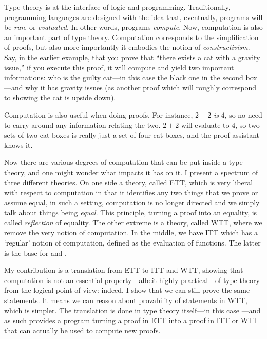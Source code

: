 Type theory is at the interface of logic and programming. Traditionally,
programming languages are designed with the idea that, eventually, programs
will be \emph{run}, or \emph{evaluated}. In other words, programs
\emph{compute}.
Now, computation is also an important part of type theory. Computation
corresponds to the simplification of proofs, but also more importantly it
embodies the notion of \emph{constructivism}. Say, in the earlier example,
that you prove that ``there exists a cat with a gravity issue,'' if you execute
this proof, it will compute and yield two important informations: who is the
guilty cat---in this case the black one in the second box---and why it has
gravity issues (as another proof which will roughly correspond to showing the
cat is upside down).

Computation is also useful when doing proofs. For instance, \(2 + 2\) \emph{is}
\(4\), so no need to carry around any information relating the two. \(2 + 2\)
will evaluate to \(4\), so two sets of two cat boxes is really just a set of
four cat boxes, and the proof assistant knows it.

Now there are various degrees of computation that can be put inside a type
theory, and one might wonder what impacts it has on it. I present a spectrum
of three different theories. On one side a theory, called \acrfull{ETT},
which is very liberal with respect to computation in that it identifies any two
things that we prove or assume equal, in such a setting, computation is no
longer directed and we simply talk about things being \emph{equal}.
This principle, turning a proof into an equality, is called \emph{reflection} of
equality.
The other extreme is a theory, called \acrfull{WTT}, where we remove the very
notion of computation. In the middle, we have \acrfull{ITT} which has a
`regular' notion of computation, defined as the evaluation of functions. The
latter is the base for \Coq and \Agda.

My contribution is a translation from \acrshort{ETT} to \acrshort{ITT} and
\acrshort{WTT}, showing that computation is not an essential property---albeit
highly practical---of type theory from the logical point of view: indeed, I show
that we can still prove the same statements.
It means we can reason about provability of statements in \acrshort{WTT}, which
is simpler.
The translation is done in type theory itself---in this case \Coq---and as such
provides a program turning a proof in \acrshort{ETT} into a proof in
\acrshort{ITT} or \acrshort{WTT} that can actually be used to compute new
proofs.


